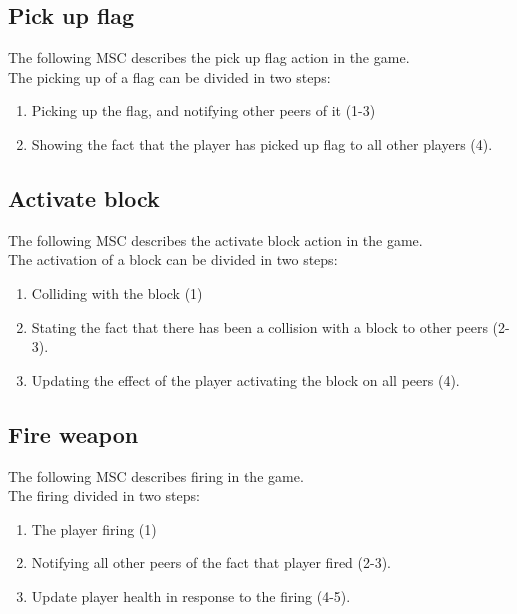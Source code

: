 \documentclass[a4paper,twoside,11pt]{article}
\begin{document}
\subsection{Pick up flag}
The following MSC describes the pick up flag action in the game.\\
The picking up of a flag can be divided in two steps:
\begin{enumerate}
\item Picking up the flag, and notifying other peers of it (1-3)
\item Showing the fact that the player has picked up flag to all other players (4).
\end{enumerate}

\subsection{Activate block}
The following MSC describes the activate block action in the game.\\
The activation of a block can be divided in two steps:
\begin{enumerate}
\item Colliding with the block (1)
\item Stating the fact that there has been a collision with a block to other peers (2-3).
\item Updating the effect of the player activating the block on all peers (4).
\end{enumerate}

\subsection{Fire weapon}
The following MSC describes firing in the game.\\
The firing divided in two steps:
\begin{enumerate}
\item The player firing (1)
\item Notifying all other peers of the fact that player fired (2-3).
\item Update player health in response to the firing (4-5).
\end{enumerate}
\end{document}
